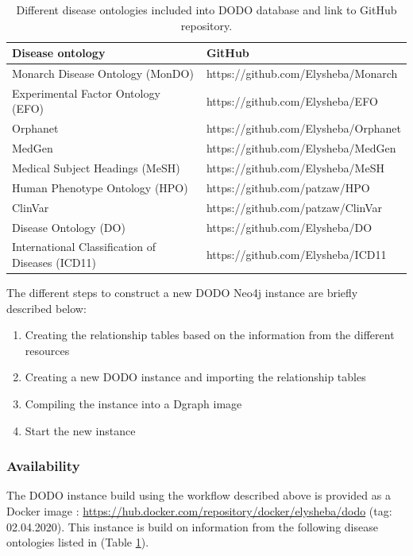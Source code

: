 \documentclass[9pt,a4paper,]{extarticle}
\begin{document}
\begin{table}

\caption{\label{tab:githubOntology}Different disease ontologies included into DODO database and link to GitHub repository.}
\centering
\begin{tabular}[t]{ll}
\toprule
Disease ontology & GitHub\\
\midrule
Monarch Disease Ontology (MonDO) & https://github.com/Elysheba/Monarch\\
Experimental Factor Ontology (EFO) & https://github.com/Elysheba/EFO\\
Orphanet & https://github.com/Elysheba/Orphanet\\
MedGen & https://github.com/Elysheba/MedGen\\
Medical Subject Headings (MeSH) & https://github.com/Elysheba/MeSH\\
\addlinespace
Human Phenotype Ontology (HPO) & https://github.com/patzaw/HPO\\
ClinVar & https://github.com/patzaw/ClinVar\\
Disease Ontology (DO) & https://github.com/Elysheba/DO\\
International Classification of Diseases (ICD11) & https://github.com/Elysheba/ICD11\\
\bottomrule
\end{tabular}
\end{table}

The different steps to construct a new DODO Neo4j instance are briefly described below:

\begin{enumerate}
\def\labelenumi{\arabic{enumi}.}
\item
  Creating the relationship tables based on the information from the different resources
\item
  Creating a new DODO instance and importing the relationship tables
\item
  Compiling the instance into a Dgraph image
\item
  Start the new instance
\end{enumerate}

\hypertarget{availability}{%
\subsubsection{Availability}\label{availability}}

The DODO instance build using the workflow described above is provided as a Docker image \citep{Docker2019}: \url{https://hub.docker.com/repository/docker/elysheba/dodo} (tag: 02.04.2020). This instance is build on information from the following disease ontologies listed in (Table \ref{tab:githubOntology}).
\end{document}
